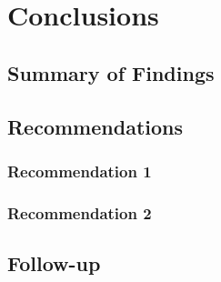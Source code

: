\chapter{Conclusions}
\label{ch:conclusions}


\section{Summary of Findings}
\label{sec:conclusions:summary}


\section{Recommendations}
\label{sec:conclusions:recommendations}

\subsection{Recommendation 1}

\subsection{Recommendation 2}

\section{Follow-up}
\label{sec:conclusions:followup}

